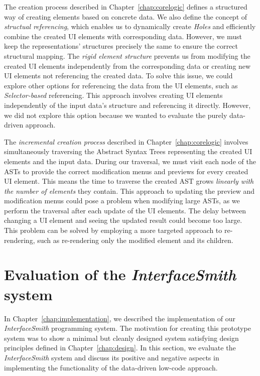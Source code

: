 The creation process described in Chapter~\ref{chap:corelogic} defines a structured way
of creating elements based on concrete data.
We also define the concept of \emph{structual referencing}, which enables us to dynamically create \emph{Holes} and efficiently combine the created UI elements with corresponding data.
However, we must keep the representations' structures precisely the same to ensure the correct structural mapping.
The \emph{rigid element structure} prevents us from modifying the created UI elements independently from the corresponding data or creating new UI elements not referencing the created data.
To solve this issue, we could explore other options for referencing the data from the UI elements, such as \emph{Selector-based} referencing.
This approach involves creating UI elements independently of the input data's structure and referencing it directly.
However, we did not explore this option because we wanted to evaluate the purely data-driven approach.

The \emph{incremental creation process} described in Chapter~\ref{chap:corelogic} involves simultaneously traversing the Abstract Syntax Trees representing the created UI elements and the input data.
During our traversal, we must visit each node of the ASTs to provide the correct modification menus and previews for every created UI element.
This means the time to traverse the created AST grows \emph{linearly with the number of elements} they contain.
This approach to updating the preview and modification menus could pose a problem when modifying large ASTs, as we perform the traversal after each update of the UI elements.
The delay between changing a UI element and seeing the updated result could become too large.
This problem can be solved by employing a more targeted approach to re-rendering, such as re-rendering only the modified element and its children.

\medskip
\section{Evaluation of the \emph{InterfaceSmith} system}

In Chapter~\ref{chap:implementation}, we described the implementation of our \emph{InterfaceSmith} programming system.
The motivation for creating this prototype system was to show a minimal but cleanly designed system satisfying design principles defined in Chapter~\ref{chap:design}.
In this section, we evaluate the \emph{InterfaceSmith} system and discuss its positive and negative aspects in implementing the functionality of the data-driven low-code approach.

